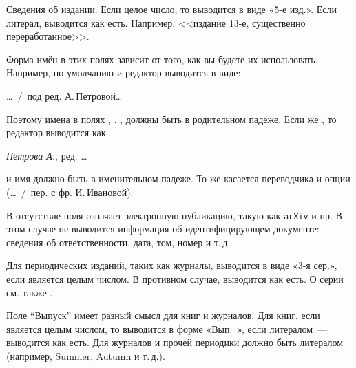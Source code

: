 \documentclass[10pt,a4paper,headings=small,numbers=enddot,english,russian]{ltxdockit}
\newenvironment{bibexample}{\begin{list}
     {}
     {\setlength{\leftmargin}{\parindent}%
      \setlength{\itemindent}{-\leftmargin}%
      \setlength{\parsep}{0pt}}}
  {\end{list}}
\begin{document}
\begin{fieldlist}

Сведения об издании. Если целое число, то выводится в виде «5-е изд.». Если литерал, выводится как есть. Например: <<издание 13-е, существенно переработанное>>.


Форма имён в этих полях зависит от того, как вы будете их использовать.
Например, по умолчанию   и редактор выводится в виде:

\begin{bibexample}
\item \ldots\ \slash\ под ред. А.\,Петровой\ldots
\end{bibexample}

Поэтому имена в полях , , ,
 должны быть в родительном падеже. Если же ,
то редактор выводится как

\begin{bibexample}
\item \textit{Петрова А.}, ред. \ldots
\end{bibexample}

и имя должно быть в именительном падеже. То же касается переводчика и опции 
(\ldots~/~пер. с фр.  И.\,Ивановой).


В  отсутствие поля  означает
электронную публикацию, такую как \texttt{arXiv} и пр.  
В этом случае не выводится информация об идентифицирующем документе:
сведения об ответственности, дата, том, номер и т.\,д.


Для периодических изданий, таких как журналы, выводится в виде «3-я сер.», если
является целым числом. В противном случае, выводится как есть.
О серии см. также .


Поле \enquote{Выпуск} имеет разный смысл для книг и журналов. Для книг, если является
целым числом, то выводится в форме «Вып.~», если литералом~--- выводится как есть.
Для журналов и прочей периодики должно быть литералом (например, Summer, Autumn и т.\,д.).

\label{ellipsis}


\end{fieldlist}
\end{document}

